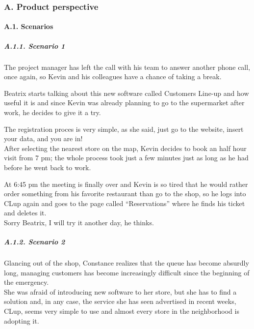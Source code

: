 \hypertarget{a.-product-perspective}{%
\subsubsection{A. Product perspective}\label{a.-product-perspective}}

\hypertarget{a.1.-scenarios}{%
\paragraph{A.1. Scenarios}\label{a.1.-scenarios}}

\hypertarget{a.1.1.-scenario-1}{%
\subparagraph{\texorpdfstring{A.1.1. Scenario 1
}{A.1.1. Scenario 1 }}\label{a.1.1.-scenario-1}}

The project manager has left the call with his team to answer another
phone call, once again, so Kevin and his colleagues have a chance of
taking a break.

Beatrix starts talking about this new software called Customers Line-up
and how useful it is and since Kevin was already planning to go to the
supermarket after work, he decides to give it a try.

The registration proces is very simple, as she said, just go to the
website, insert your data, and you are in!\\
After selecting the nearest store on the map, Kevin decides to book an
half hour visit from 7 pm; the whole process took just a few minutes
just as long as he had before he went back to work.

At 6:45 pm the meeting is finally over and Kevin is so tired that he
would rather order something from his favorite restaurant than go to the
shop, so he logs into CLup again and goes to the page called
``Reservations'' where he finds his ticket and deletes it.\\
Sorry Beatrix, I will try it another day, he thinks.

\hypertarget{a.1.2.-scenario-2}{%
\subparagraph{\texorpdfstring{A.1.2. Scenario 2
}{A.1.2. Scenario 2 }}\label{a.1.2.-scenario-2}}

Glancing out of the shop, Constance realizes that the queue has become
absurdly long, managing customers has become increasingly difficult
since the beginning of the emergency.\\
She was afraid of introducing new software to her store, but she has to
find a solution and, in any case, the service she has seen advertised in
recent weeks, CLup, seems very simple to use and almost every store in
the neighborhood is adopting it.

